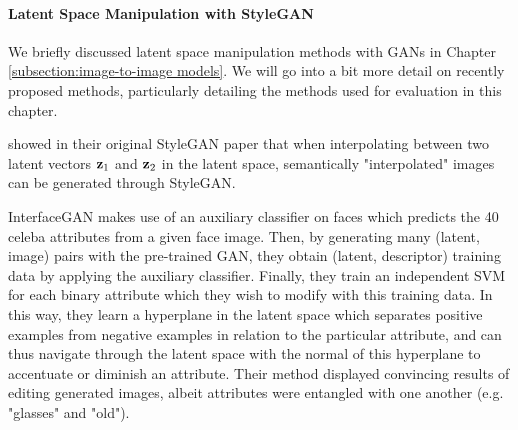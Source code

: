  



\paragraph{Latent Space Manipulation with StyleGAN}
We briefly discussed latent space manipulation methods with \ac{GAN}s in 
Chapter \ref{subsection:image-to-image models}. We will go into a bit more detail 
on recently proposed methods, particularly detailing the methods used for evaluation 
in this chapter.

\cite{karra2019stylegan} showed in their original StyleGAN paper that 
when interpolating between two latent vectors $\mathbf{z}_1$ and $\mathbf{z}_2$ in the 
latent space, semantically "interpolated" images can be generated through
StyleGAN.

InterfaceGAN \citep{shen2020} makes use of an auxiliary classifier on faces which predicts 
the 40 celeba \citep{celeba} attributes from a given face image. 
Then, by generating many (latent, image) pairs with the pre-trained \ac{GAN},
they obtain (latent, descriptor) training data by applying the auxiliary 
classifier. Finally, they train an independent SVM \citep{svms} for each 
binary attribute which they wish to modify with this training data. In this way,
they learn a hyperplane in the latent space which separates positive examples 
from negative examples in relation to the particular attribute, and can thus 
navigate through the latent space with the normal of this hyperplane to 
accentuate or diminish an attribute. Their method displayed convincing results 
of editing generated images, albeit attributes were entangled with one 
another (e.g. "glasses" and "old").

